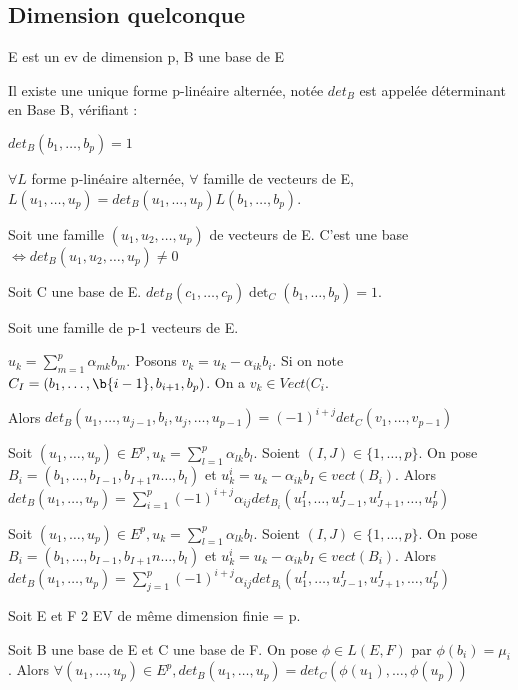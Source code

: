 \documentclass[french]{yLectureNote}
\begin{document}
\subsection{Dimension quelconque}
E est un ev de dimension p, B une base de E
\begin{theorem}[admis]
 Il existe une unique forme p-linéaire alternée, notée \(det_B\) est appelée déterminant en Base B, vérifiant :

 \(det_B(b_1,\dots, b_p) = 1\)

 \(\forall L\) forme p-linéaire alternée, \(\forall\) famille de vecteurs de E, \(L(u_1,\dots, u_p) = det_B(u_1,\dots, u_p)L(b_1,\dots, b_p)\).
\end{theorem}
\begin{proposition}
Soit une famille \((u_1,u_2,\dots,u_p)\) de vecteurs de E. C'est une base \(\iff det_B(u_1,u_2,\dots,u_p)\neq 0\)
\end{proposition}
\begin{proposition}
Soit C une base de E. \(det_B(c_1,\dots,c_p)\det_C(b_1,\dots, b_p) = 1\).
\end{proposition}
\begin{proposition}
Soit une famille de p-1 vecteurs de E.

\(u_k = \sum_{m=1}^p \alpha_{mk}b_m\). Posons \(v_k = u_k - \alpha_{ik}b_i\). Si on note \(C_I = (b_1,\dots,\b{i-1},b_{i+1},b_p)\). On a \(v_k \in Vect(C_i\).

Alors
\(det_B(u_1,\dots, u_{j-1}, b_i,u_j,\dots, u_{p-1}) = (-1)^{i+j}det_C (v_1,\dots, v_{p-1})\)
\end{proposition}
\begin{proposition}
Soit \((u_1,\dots, u_p)\in E^p, u_k = \sum^p_{l=1}\alpha_{lk}b_l\). Soient \((I,J)\in \{1,\dots, p\}\). On pose \(B_i = (b_1,\dots,b_{I-1},b_{I+1}n\dots, b_l)\) et \(u_k^i = u_k-\alpha_{ik}b_I\in vect(B_i)\). Alors \(det_B(u_1,\dots, u_p) = \sum_{i=1}^p (-1)^{i+j}\alpha_{ij}det_{B_i}(u_1^I,\dots, u_{J-1}^I, u_{J+1}^I,\dots, u_p^I)\)
\end{proposition}
\begin{proposition}
Soit \((u_1,\dots, u_p)\in E^p, u_k = \sum^p_{l=1}\alpha_{lk}b_l\). Soient \((I,J)\in \{1,\dots, p\}\). On pose \(B_i = (b_1,\dots,b_{I-1},b_{I+1}n\dots, b_l)\) et \(u_k^i = u_k-\alpha_{ik}b_I\in vect(B_i)\). Alors \(det_B(u_1,\dots, u_p) = \sum_{j=1}^p (-1)^{i+j}\alpha_{ij}det_{B_i}(u_1^I,\dots, u_{J-1}^I, u_{J+1}^I,\dots, u_p^I)\)
\end{proposition}
\begin{proposition}
Soit E et F 2 EV de m\^eme dimension finie = p.

Soit B une base de E et C une base de F. On pose \(\phi\in L(E,F)\) par \(\phi(b_i) = \mu_i\). Alors \(\forall (u_1,\dots, u_p)\in E^p, det_B(u_1,\dots, u_p) = det_C(\phi(u_1),\dots, \phi(u_p))\)
\end{proposition}
\end{document}
